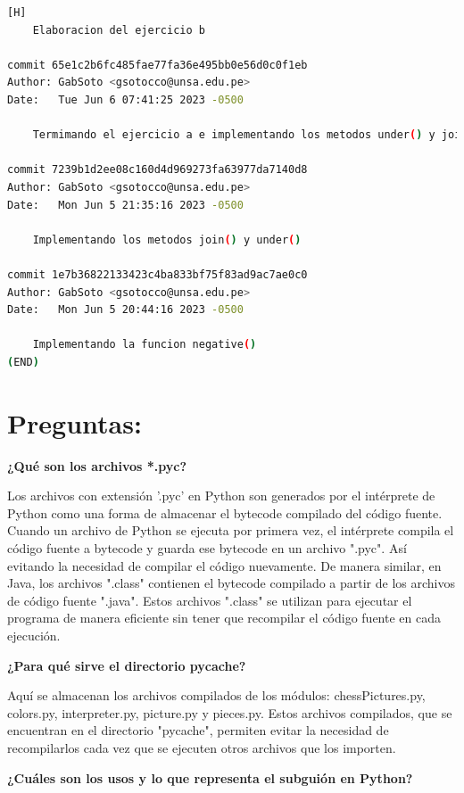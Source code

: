 \documentclass{article}
\begin{document}
\begin{lstlisting}[language=bash,caption={Commits}][H]
    Elaboracion del ejercicio b

commit 65e1c2b6fc485fae77fa36e495bb0e56d0c0f1eb
Author: GabSoto <gsotocco@unsa.edu.pe>
Date:   Tue Jun 6 07:41:25 2023 -0500

    Termimando el ejercicio a e implementando los metodos under() y join()

commit 7239b1d2ee08c160d4d969273fa63977da7140d8
Author: GabSoto <gsotocco@unsa.edu.pe>
Date:   Mon Jun 5 21:35:16 2023 -0500

    Implementando los metodos join() y under()

commit 1e7b36822133423c4ba833bf75f83ad9ac7ae0c0
Author: GabSoto <gsotocco@unsa.edu.pe>
Date:   Mon Jun 5 20:44:16 2023 -0500

    Implementando la funcion negative()
(END)
\end{lstlisting}

\section{Preguntas:}

	\textbf{¿Qué son los archivos *.pyc?}
	
\vspace{0.3cm}
Los archivos con extensión '.pyc' en Python son generados por el intérprete de Python como una forma de almacenar el bytecode compilado del código fuente. Cuando un archivo de Python se ejecuta por primera vez, el intérprete compila el código fuente a bytecode y guarda ese bytecode en un archivo ".pyc". Así evitando la necesidad de compilar el código nuevamente.
De manera similar, en Java, los archivos ".class" contienen el bytecode compilado a partir de los archivos de código fuente ".java". Estos archivos ".class" se utilizan para ejecutar el programa de manera eficiente sin tener que recompilar el código fuente en cada ejecución.
\vspace{0.3cm}

	\textbf{¿Para qué sirve el directorio pycache?}
	
	\vspace{0.3cm}
Aquí se almacenan los archivos compilados de los módulos: chessPictures.py, colors.py, interpreter.py, picture.py y pieces.py. Estos archivos compilados, que se encuentran en el directorio "pycache", permiten evitar la necesidad de recompilarlos cada vez que se ejecuten otros archivos que los importen.
	\vspace{0.3cm}
	
	\textbf{¿Cuáles son los usos y lo que representa el subguión en Python?}
	
\end{document}
